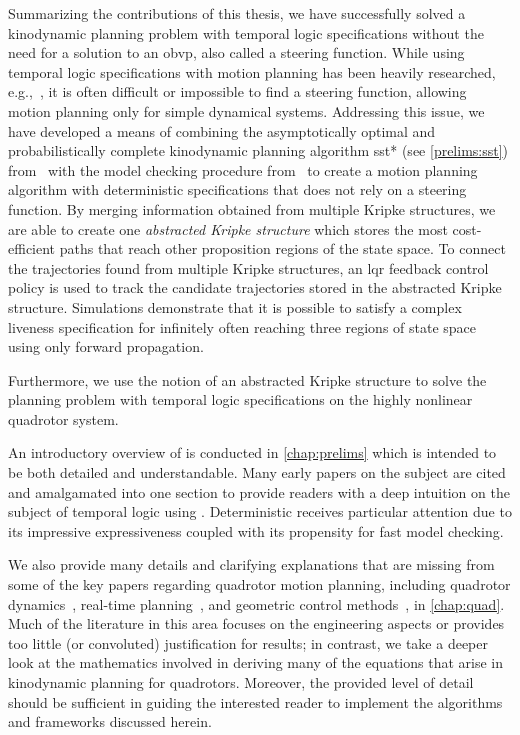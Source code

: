 Summarizing the contributions of this thesis, we have successfully solved a kinodynamic planning problem with temporal logic specifications without the need for a solution to an \gls{obvp}, also called a steering function. While using temporal logic specifications with motion planning has been heavily researched, e.g.,~\cite{Ayala2013, Bhatia2010, Karaman2009,Lin2014, Wolff2014}, it is often difficult or impossible to find a steering function, allowing motion planning only for simple dynamical systems. Addressing this issue, we have developed a means of combining the asymptotically optimal and probabilistically complete kinodynamic planning algorithm \gls{sst}* (see \autoref{prelims:sst}) from~\cite{Li2016} with the model checking procedure from~\cite{Karaman2009} to create a motion planning algorithm with deterministic \mucalc{} specifications that does not rely on a steering function. By merging information obtained from multiple Kripke structures, we are able to create one \emph{abstracted Kripke structure} which stores the most cost-efficient paths that reach other proposition regions of the state space. To connect the trajectories found from multiple Kripke structures, an \gls{lqr} feedback control policy is used to track the candidate trajectories stored in the abstracted Kripke structure. Simulations demonstrate that it is possible to satisfy a complex liveness specification for infinitely often reaching three regions of state space using only forward propagation.

Furthermore, we use the notion of an abstracted Kripke structure to solve the planning problem with temporal logic specifications on the highly nonlinear quadrotor system. %

An introductory overview of \mucalc{} is conducted in \autoref{chap:prelims} which is intended to be both detailed and understandable. Many early papers on the subject are cited and amalgamated into one section to provide readers with a deep intuition on the subject of temporal logic using \mucalc{}. Deterministic \mucalc{} receives particular attention due to its impressive expressiveness coupled with its propensity for fast model checking.

We also provide many details and clarifying explanations that are missing from some of the key papers regarding quadrotor motion planning, including quadrotor dynamics~\cite{Mellinger2011}, real-time planning~\cite{Allen2016}, and geometric control methods~\cite{Lee2010}, in \autoref{chap:quad}. Much of the literature in this area focuses on the engineering aspects or provides too little (or convoluted) justification for results; in contrast, we take a deeper look at the mathematics involved in deriving many of the equations that arise in kinodynamic planning for quadrotors. Moreover, the provided level of detail should be sufficient in guiding the interested reader to implement the algorithms and frameworks discussed herein.


